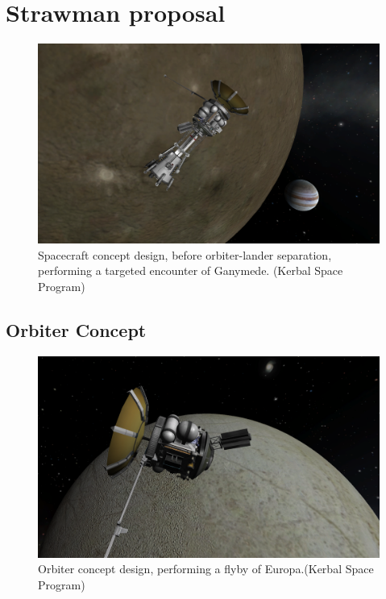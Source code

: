 \section{Strawman proposal}
\begin{figure}[htb!]
\centering
\includegraphics[width=\textwidth]{figures/Orbiter/9.PNG}
\caption{Spacecraft concept design, before orbiter-lander separation, performing a targeted encounter of Ganymede. (Kerbal Space Program)}
\label{fig:spacecraft}
\end{figure}

\newpage 
\subsection{Orbiter Concept}

\begin{figure}[htb!]
\centering
\includegraphics[width=\textwidth]{figures/Orbiter/orbiter.PNG}
\caption{Orbiter concept design, performing a flyby of Europa.(Kerbal Space Program)}
\label{fig:orbiter}
\end{figure}

